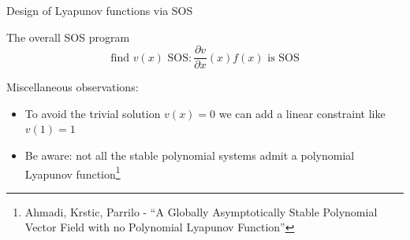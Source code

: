 \documentclass[aspectratio=169]{beamer}
\begin{document}
\begin{frame}{Design of Lyapunov functions via SOS
\href{https://colab.research.google.com/github/TobiaMarcucci/optimal_control_pisa/blob/master/demos/lyapunov_poly.ipynb}{}}
\begin{block}{The overall SOS program}
$$
\text{find } v(x) \text{ SOS} : \frac{\partial v}{\partial x}(x) f(x) \text{ is SOS}
$$
\end{block}
Miscellaneous observations:
\begin{itemize}
\item
To avoid the trivial solution $v(x) = 0$ we can add a linear constraint like $v(1) = 1$
\item
Be aware: not all the stable polynomial systems admit a polynomial Lyapunov function\footnote{Ahmadi, Krstic, Parrilo - ``A Globally Asymptotically Stable Polynomial Vector Field with no Polynomial Lyapunov Function''}
\end{itemize}
\end{frame}
\end{document}
